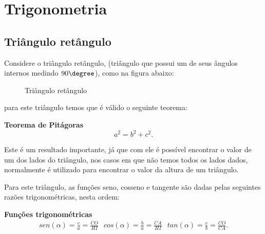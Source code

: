 \chapter{Trigonometria}

\section{Triângulo retângulo}
%
  Considere o triângulo retângulo, (triângulo que possui um de seus ângulos internos medindo $90 \degree$), como na figura abaixo:
  \begin{figure}[H]
   \centering
   \caption{Triângulo retângulo}
  \end{figure}
 para este triângulo temos que é válido o seguinte teorema:

 \vskip0.3cm

\colorbox{azul}{
 \begin{minipage}{0.9\linewidth}
 \begin{center}
 \textbf{Teorema de Pitágoras}
  \[a^2= b^2 + c^2.\]
 \end{center}
 \end{minipage}}

 \vskip0.3cm

 Este é um resultado importante, já que com ele é possível encontrar o valor de um dos lados do triângulo, nos casos em que não temos todos os lados dados, normalmente é utilizado para encontrar o valor da altura de um triângulo.

 Para este triângulo, as funções seno, cosseno e tangente são dadas pelas seguintes razões trigonométricas, nesta ordem:

 \vskip0.3cm

\colorbox{azul}{
 \begin{minipage}{0.9\linewidth}
 \begin{center}
 \textbf{Funções trigonométricas}
  \begin{eqnarray*}
   sen(\alpha)= \frac{c}{a}= \frac{CO}{HI} \; \ \ cos(\alpha)= \frac{b}{a}= \frac{CA}{HI} \; \ \ tan(\alpha)= \frac{c}{b}= \frac{CO}{CA}.
 \end{eqnarray*}
 \end{center}
 \end{minipage}}

